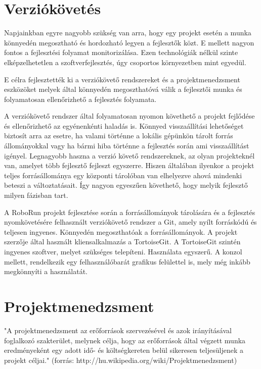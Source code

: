 \section{Verziókövetés}

Napjainkban egyre nagyobb szükség van arra, hogy egy projekt esetén a munka könnyedén megosztható és hordozható legyen a fejlesztők közt. E mellett nagyon fontos a fejlesztési folyamat monitorizálása. Ezen technológiák nélkül szinte elképzelhetetlen a szoftverfejlesztés, úgy csoportos környezetben mint egyedül.

	E célra fejlesztették  ki a verziókövető rendszereket és a projektmenedzsment eszközöket melyek által könnyedén megoszthatóvá válik a fejlesztői munka és folyamatosan ellenőrizhető a fejlesztés folyamata.  
	
	A verziókövető rendszer által  folyamatosan nyomon követhető a projekt fejlődése és ellenőrizhető az egyénenkénti haladás is. Könnyed visszaállítási lehetőséget biztosít arra az esetre, ha valami történne a lokális gépünkön tárolt forrás állományokkal vagy ha bármi hiba történne a fejlesztés során ami visszaállítást igényel. Legnagyobb haszna a verzió követő rendszereknek, az olyan projekteknél van, amelyet több fejlesztő fejleszt egyszerre. Hiszen általában ilyenkor a projekt teljes forrásállománya egy központi tárolóban van elhelyezve ahová mindenki beteszi a változtatásait. Így nagyon egyeszűen követhető, hogy melyik fejlesztő milyen fázisban tart. 
	
	A RoboRun projekt fejlesztése során a forrásállományok tárolására és a fejlesztés nyomkövetésére felhasznált verziókövető rendszer a Git\citep{git}, amely nyílt forráskódú és teljesen ingyenes. Könnyedén megoszthatóak a forrásállományok. A projekt szerzője által használt kliensalkalmazás a  TortoiseGit\citep{tortoisegit}. A TortoiseGit szintén ingyenes szoftver, melyet szükséges telepíteni. Használata egyszerű. A konzol mellett, rendelkezik egy felhasználóbarát grafikus felülettel is, mely még inkább megkönnyíti a használatát.

\section{Projektmenedzsment}

"A projektmenedzsment az erőforrások szervezésével és azok irányításával foglalkozó szakterület, melynek célja, hogy az erőforrások által végzett munka eredményeként egy adott idő- és költségkereten belül sikeresen teljesüljenek a projekt céljai." (forrás: http://hu.wikipedia.org/wiki/Projektmenedzsment)

